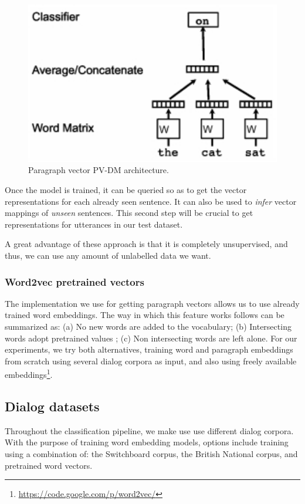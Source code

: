 \begin{figure}
\centering
\begin{minipage}{.3\textwidth}
\includegraphics[width=1\textwidth]{img/par2vec_arq}
\caption{Paragraph vector PV-DM architecture.}
\label{fig:p2v_arq}
\end{minipage}
\end{figure}

Once the model is trained, it can be queried so as to get the vector representations for each already seen sentence. It can also be used to \emph{infer} vector mappings of \emph{unseen} sentences. This second step will be crucial to get representations for utterances in our test dataset.

A great advantage of these approach is that it is completely unsupervised, and thus, we can use any amount of unlabelled data we want.

\subsubsection*{Word2vec pretrained vectors}
The implementation we use for getting paragraph vectors allows us to use already trained word embeddings. The way in which this feature works follows can be summarized as: (a) No new words are added to the vocabulary; (b) Intersecting words adopt pretrained values ; (c) Non intersecting words are left alone.
For our experiments, we try both alternatives, training word and paragraph embeddings from scratch using several dialog corpora as input, and also using freely available embeddings\footnote{\url{https://code.google.com/p/word2vec/}}.

\subsection{Dialog datasets}
Throughout the classification pipeline, we make use use different dialog corpora. With the purpose of training word embedding models, options include training using a combination of: the Switchboard corpus, the British National corpus, and pretrained word vectors.

